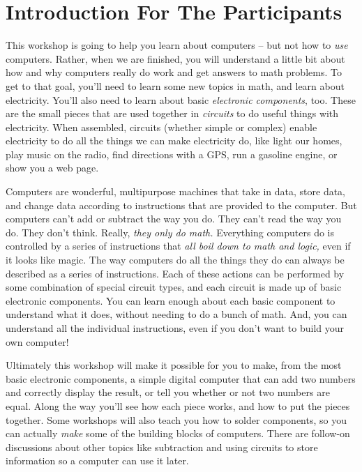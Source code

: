 \section{Introduction For The Participants}

This workshop is going to help you learn about computers -- but not how to \emph{use} computers. Rather, when we are finished, you will understand a little bit about how and why computers really do work and get answers to math problems. To get to that goal, you'll need to learn some new topics in math, and learn about electricity. You'll also need to learn about basic \emph{electronic components}, too. These are the small pieces that are used together in \emph{circuits} to do useful things with electricity. When assembled, circuits (whether simple or complex) enable electricity to do all the things we can make electricity do, like light our homes, play music on the radio, find directions with a GPS, run a gasoline engine, or show you a web page.

Computers are wonderful, multipurpose machines that take in data, store data, and change data according to instructions that are provided to the computer. But computers can't add or subtract the way you do. They can't read the way you do. They don't think. Really,  \emph{they only do math.} Everything computers do is controlled by a series of instructions that \emph{all boil down to math and logic,} even if it looks like magic. The way computers do all the things they do can always be described as a series of instructions. Each of these actions can be performed by some combination of special circuit types, and each circuit is made up of basic electronic components. You can learn enough about each basic component to understand what it does, without needing to do a bunch of math. And, you can understand all the individual instructions, even if you don't want to build your own computer!

Ultimately this workshop will make it possible for you to make, from the most basic electronic components, a simple digital computer that can add two numbers and correctly display the result, or tell you whether or not two numbers are equal. Along the way you'll see how each piece works, and how to put the pieces together. Some workshops will also teach you how to solder components, so you can actually \emph{make} some of the building blocks of computers. There are follow-on discussions about other topics like subtraction and using circuits to store information so a computer can use it later.

